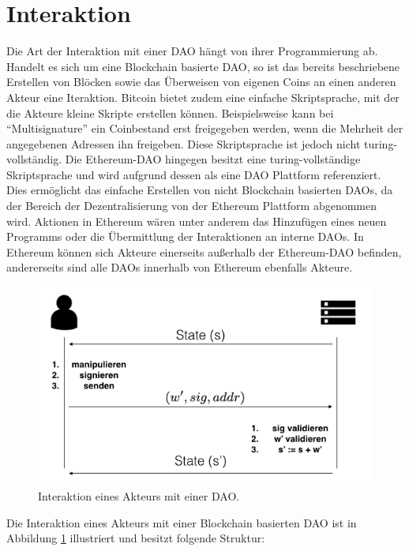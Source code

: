 \documentclass[a4paper,12pt]{report}
\begin{document}
\section{Interaktion}
\label{interaction}
Die Art der Interaktion mit einer DAO hängt von ihrer Programmierung ab. Handelt es sich um eine Blockchain basierte DAO, so ist das bereits beschriebene Erstellen von Blöcken sowie das Überweisen von eigenen Coins an einen anderen Akteur eine Iteraktion. Bitcoin bietet zudem eine einfache Skriptsprache, mit der die Akteure kleine Skripte erstellen können. Beispielsweise kann bei ``Multisignature'' ein Coinbestand erst freigegeben werden, wenn die Mehrheit der angegebenen Adressen ihn freigeben. Diese Skriptsprache ist jedoch nicht turing-vollständig. Die Ethereum-DAO hingegen besitzt eine turing-vollständige Skriptsprache und wird aufgrund dessen als eine DAO Plattform referenziert. Dies ermöglicht das einfache Erstellen von nicht Blockchain basierten DAOs, da der Bereich der Dezentralisierung von der Ethereum Plattform abgenommen wird. Aktionen in Ethereum wären unter anderem das Hinzufügen eines neuen Programms oder die Übermittlung der Interaktionen an interne DAOs. In Ethereum können sich Akteure einerseits außerhalb der Ethereum-DAO befinden, andererseits sind alle DAOs innerhalb von Ethereum ebenfalls Akteure.

\begin{figure}[ht]
  \centering
  \includegraphics[width=1\textwidth]{bilder/interaktion.png}
  \caption{Interaktion eines Akteurs mit einer DAO.}
  \label{intSeq}
\end{figure}

Die Interaktion eines Akteurs mit einer Blockchain basierten DAO ist in Abbildung \ref{intSeq} illustriert und besitzt folgende Struktur:
\end{document}
